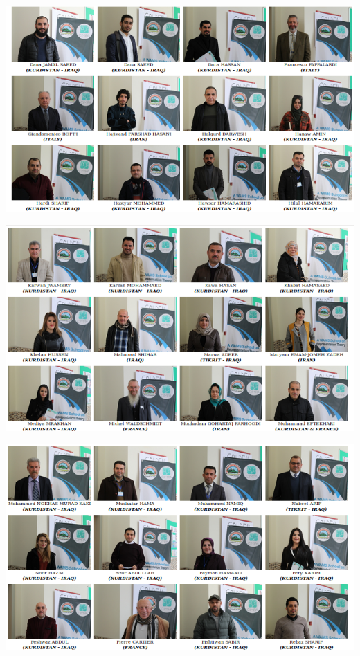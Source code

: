 \documentclass[12pt,a4paper]{scrartcl}
\begin{document}
\centerline{\includegraphics[width=18cm]{trombino2.png}}

\centerline{\includegraphics[width=18cm]{trombino3.png}}

\centerline{\includegraphics[width=18cm]{trombino3a.png}}
\end{document}
